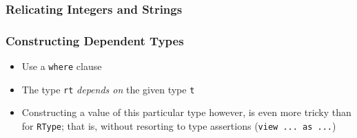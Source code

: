\begin{frame}

\frametitle{Relicating Integers and Strings}


\end{frame}

\begin{frame}

\frametitle{Constructing Dependent Types}


\begin{itemize}

\item Use a \lstinline{where} clause

\item The type \lstinline{rt} \emph{depends on} the given type
\lstinline{t}

\item Constructing a value of this particular type however, is even
more tricky than for \texttt{RType}; that is, without resorting to
type assertions (\lstinline{view ... as ...})

\end{itemize}

\end{frame}
